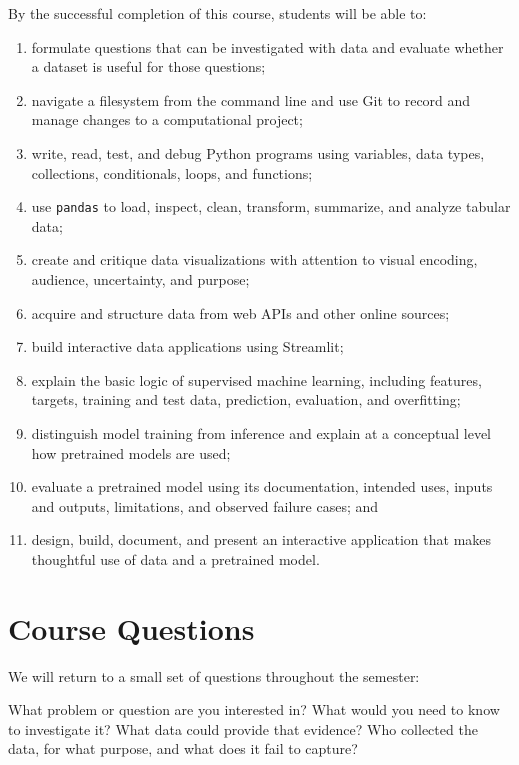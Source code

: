 \documentclass[11pt]{article}
\begin{document}
By the successful completion of this course, students will be able to:

\begin{enumerate}[leftmargin=*]
  \item formulate questions that can be investigated with data and evaluate
        whether a dataset is useful for those questions;
  \item navigate a filesystem from the command line and use Git to record and
        manage changes to a computational project;
  \item write, read, test, and debug Python programs using variables, data
        types, collections, conditionals, loops, and functions;
  \item use \texttt{pandas} to load, inspect, clean, transform, summarize, and
        analyze tabular data;
  \item create and critique data visualizations with attention to visual
        encoding, audience, uncertainty, and purpose;
  \item acquire and structure data from web APIs and other online sources;
  \item build interactive data applications using Streamlit;
  \item explain the basic logic of supervised machine learning, including
        features, targets, training and test data, prediction, evaluation,
        and overfitting;
  \item distinguish model training from inference and explain at a conceptual
        level how pretrained models are used;
  \item evaluate a pretrained model using its documentation, intended uses,
        inputs and outputs, limitations, and observed failure cases; and
  \item design, build, document, and present an interactive application that
        makes thoughtful use of data and a pretrained model.
\end{enumerate}

\section{Course Questions}

We will return to a small set of questions throughout the semester:

\begin{dataprompt}
What problem or question are you interested in? What would you need to know
to investigate it? What data could provide that evidence? Who collected the
data, for what purpose, and what does it fail to capture?
\end{dataprompt}
\end{document}
